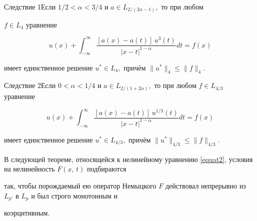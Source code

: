 \begin{newthm}{Следствие 1}Если $1/2<\alpha<3/4$ и $a\in L_{2/(2\alpha-1)},$ то при любом

$f\in L_4$ уравнение

$$

u(x)+\int _{-\infty}^\infty

\frac{[a(x)-a(t)]\,u^3(t)}{|x-t|^{1-\alpha}}dt=f(x)

$$

имеет единственное решение $u^*\in L_4,$ причём $\|u^*\|_4\leq \|f\|_4.$

\end{newthm}



\smallskip



\begin{newthm}{Следствие 2}Если $0<\alpha<1/4$ и $a\in L_{2/(1+2\alpha)},$ то при любом $f\in L_{4/3}$ уравнение

$$

u(x)+\int _{-\infty}^\infty

\frac{[a(x)-a(t)]\,u^{1/3}(t)}{|x-t|^{1-\alpha}}dt=f(x)

$$

имеет единственное решение $u^*\in L_{4/3},$ причём $\|u^*\|_{4/3}\leq \|f\|_{4/3}.$

\end{newthm}



\smallskip



В следующей теореме, относящейся к нелинейному уравнению \eqref{equat2}, условия на нелинейность $F(x,\,t)$ подбираются

так, чтобы порождаемый ею оператор Немыцкого $F$ действовал непрерывно из $L_{p'}$ в $L_p$ и был строго монотонным и

коэрцитивным.



\smallskip



